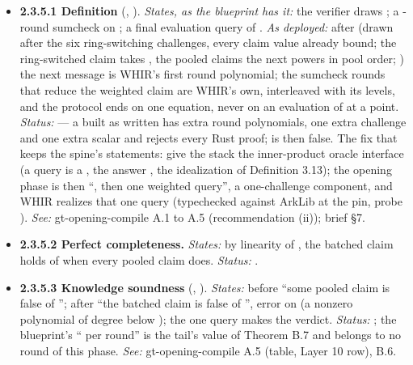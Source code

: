 \begin{itemize}[label={}, leftmargin=1.3em, itemindent=-1.3em, labelwidth=0pt, labelsep=0pt, itemsep=4pt, topsep=3pt]
\item {}\label{obl:node-2.3.5.1}\oblflag\textbf{2.3.5.1 Definition} (, ). \emph{States, as the blueprint has it:} the verifier draws ; a -round sumcheck on ; a final evaluation query of . \emph{As deployed:} after  (drawn after the six ring-switching challenges, every claim value already bound; the ring-switched claim takes , the pooled claims the next powers in pool order; ) the next message is WHIR's first round polynomial; the sumcheck rounds that reduce the weighted claim are WHIR's own, interleaved with its levels, and the protocol ends on one equation, never on an evaluation of  at a point. \emph{Status:}   — a  built as written has  extra round polynomials, one extra challenge and one extra scalar and rejects every Rust proof;  is then false. The fix that keeps the spine's statements: give the stack the inner-product oracle interface (a query is a , the answer , the idealization of Definition 3.13); the opening phase is then ``, then one weighted query'', a one-challenge component, and WHIR realizes that one query (typechecked against ArkLib at the pin, probe ). \emph{See:} gt-opening-compile A.1 to A.5 (recommendation (ii)); brief §7.
\item {}\label{obl:node-2.3.5.2}\textbf{2.3.5.2 Perfect completeness.} \emph{States:} by linearity of , the batched claim holds of  when every pooled claim does. \emph{Status:} .
\item {}\label{obl:node-2.3.5.3}\textbf{2.3.5.3 Knowledge soundness} (, ). \emph{States:} before  ``some pooled claim is false of ''; after  ``the batched claim is false of '', error  on  (a nonzero polynomial of degree below ); the one query makes the verdict. \emph{Status:} ; the blueprint's `` per round'' is the tail's value of Theorem B.7 and belongs to no round of this phase. \emph{See:} gt-opening-compile A.5 (table, Layer 10 row), B.6.

\end{itemize}

